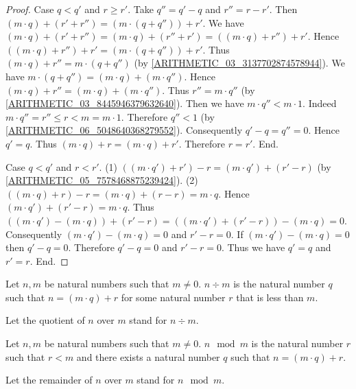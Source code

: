 \documentclass[10pt]{article}
\begin{document}
\begin{forthel}
\begin{proof}
      Case $q < q'$ and $r \geq r'$.
        Take $q'' = q' - q$ and $r'' = r - r'$.
        Then $(m \cdot q) + (r' + r'') = (m \cdot (q + q'')) + r'$.
        We have $(m \cdot q) + (r' + r'')
          = (m \cdot q) + (r'' + r')
          = ((m \cdot q) + r'') + r'$.
        Hence $((m \cdot q) + r'') + r' = (m \cdot (q + q'')) + r'$.
        Thus $(m \cdot q) + r'' = m \cdot (q + q'')$ (by \cref{ARITHMETIC_03_3137702874578944}).
        We have $m \cdot (q + q'') = (m \cdot q) + (m \cdot q'')$.
        Hence $(m \cdot q) + r'' = (m \cdot q) + (m \cdot q'')$.
        Thus $r'' = m \cdot q''$ (by \cref{ARITHMETIC_03_8445946379632640}).
        Then we have $m \cdot q'' < m \cdot 1$.
        Indeed $m \cdot q''
          = r''
          \leq r
          < m
          = m \cdot 1$.
        Therefore $q'' < 1$ (by \cref{ARITHMETIC_06_5048640368279552}).
        Consequently $q' - q = q'' = 0$.
        Hence $q' = q$.
        Thus $(m \cdot q) + r = (m \cdot q) + r'$.
        Therefore $r = r'$.
      End.

      Case $q < q'$ and $r < r'$.
        (1) $((m \cdot q') + r') - r = (m \cdot q') + (r' - r)$ (by \cref{ARITHMETIC_05_7578468875239424}).
        (2) $((m \cdot q) + r) - r
          = (m \cdot q) + (r - r)
          = m \cdot q$.
        Hence $(m \cdot q') + (r' - r) = m \cdot q$.
        Thus $((m \cdot q') - (m \cdot q)) + (r' - r)
          = ((m \cdot q') + (r' - r)) - (m \cdot q)
          = 0$.
        Consequently $(m \cdot q') - (m \cdot q) = 0$ and $r' - r = 0$.
        If $(m \cdot q') - (m \cdot q) = 0$ then $q' - q = 0$.
        Therefore $q' - q = 0$ and $r' - r = 0$.
        Thus we have $q' = q$ and $r' = r$.
      End.
    \end{proof}
  \end{forthel}

  \begin{forthel}
    \begin{definition}
      Let $n, m$ be natural numbers such that $m \neq 0$.
      $n \div m$ is the natural number $q$ such that $n = (m \cdot q) + r$ for
      some natural number $r$ that is less than $m$.
    \end{definition}

    Let the quotient of $n$ over $m$ stand for $n \div m$.
  \end{forthel}

  \begin{forthel}
    \begin{definition}
      Let $n, m$ be natural numbers such that $m \neq 0$.
      $n \mod m$ is the natural number $r$ such that $r < m$ and there exists a
      natural number $q$ such that $n = (m \cdot q) + r$.
    \end{definition}

    Let the remainder of $n$ over $m$ stand for $n \mod m$.
  \end{forthel}
\end{document}
